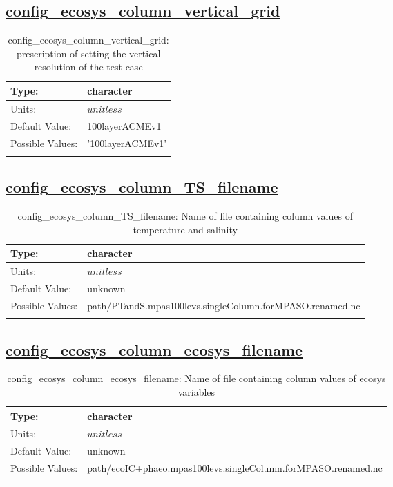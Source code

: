 \subsection[config\_ecosys\_column\_vertical\_grid]{\hyperref[sec:nm_tab_ecosys_column]{config\_ecosys\_column\_vertical\_grid}}
\label{subsec:nm_sec_config_ecosys_column_vertical_grid}
\begin{center}
\begin{longtable}{| p{2.0in} || p{4.0in} |}
    \hline
    Type: & character \\
    \hline
    Units: & $unitless$ \\
    \hline
    Default Value: & 100layerACMEv1 \\
    \hline
    Possible Values: & '100layerACMEv1' \\
    \hline
    \caption{config\_ecosys\_column\_vertical\_grid: prescription of setting the vertical resolution of the test case}
\end{longtable}
\end{center}
\subsection[config\_ecosys\_column\_TS\_filename]{\hyperref[sec:nm_tab_ecosys_column]{config\_ecosys\_column\_TS\_filename}}
\label{subsec:nm_sec_config_ecosys_column_TS_filename}
\begin{center}
\begin{longtable}{| p{2.0in} || p{4.0in} |}
    \hline
    Type: & character \\
    \hline
    Units: & $unitless$ \\
    \hline
    Default Value: & unknown \\
    \hline
    Possible Values: & path/PTandS.mpas100levs.singleColumn.forMPASO.renamed.nc \\
    \hline
    \caption{config\_ecosys\_column\_TS\_filename: Name of file containing column values of temperature and salinity}
\end{longtable}
\end{center}
\subsection[config\_ecosys\_column\_ecosys\_filename]{\hyperref[sec:nm_tab_ecosys_column]{config\_ecosys\_column\_ecosys\_filename}}
\label{subsec:nm_sec_config_ecosys_column_ecosys_filename}
\begin{center}
\begin{longtable}{| p{2.0in} || p{4.0in} |}
    \hline
    Type: & character \\
    \hline
    Units: & $unitless$ \\
    \hline
    Default Value: & unknown \\
    \hline
    Possible Values: & path/ecoIC+phaeo.mpas100levs.singleColumn.forMPASO.renamed.nc \\
    \hline
    \caption{config\_ecosys\_column\_ecosys\_filename: Name of file containing column values of ecosys variables}
\end{longtable}
\end{center}
